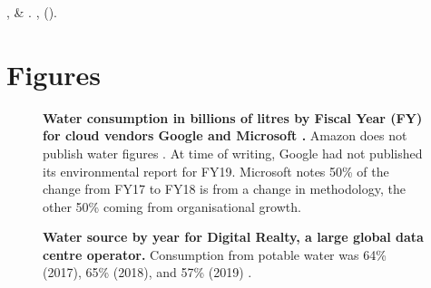 \documentclass{article}
\begin{document}
\begin{thebibliography}{10}
,  \& 
\newblock {}.
\newblock \emph{}
  \textbf{},  ().

\end{thebibliography}

\section*{Figures}

\begin{figure}
\caption{
    \textbf{Water consumption in billions of litres by Fiscal Year (FY) for cloud
    vendors Google \cite{google_environmental_2020} and Microsoft
    \cite{microsoft_2019_2020}.} Amazon does not publish water figures
    \cite{amazon_reducing_2019}. At time of writing, Google had not published
    its environmental report for FY19. Microsoft notes 50\% of the change from
    FY17 to FY18 is from a change in methodology, the other 50\% coming from
    organisational growth.
    }
\label{figure:cloud-water-use}
\end{figure}

\begin{figure}
\caption{
    \textbf{Water source by year for Digital Realty, a large global data centre
    operator.} Consumption from potable water was 64\% (2017), 65\% (2018),
    and 57\% (2019) \cite{digital_realty_environmental_2019}.
}
\label{figure:digital-realty-water-source}
\end{figure}
\end{document}
